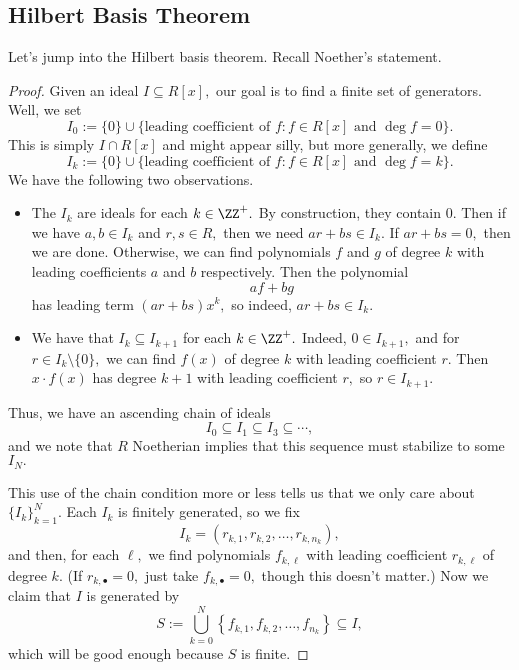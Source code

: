 \documentclass[../notes.tex]{subfiles}
\begin{document}
\subsection{Hilbert Basis Theorem}
Let's jump into the Hilbert basis theorem. Recall Noether's statement.
\hilbert*
\begin{proof}
	Given an ideal $I\subseteq R[x],$ our goal is to find a finite set of generators. Well, we set
	\[I_0:=\{0\}\cup\{\text{leading coefficient of }f:f\in R[x]\text{ and }\deg f=0\}.\]
	This is simply $I\cap R[x]$ and might appear silly, but more generally, we define
	\[I_k:=\{0\}\cup\{\text{leading coefficient of }f:f\in R[x]\text{ and }\deg f=k\}.\]
	We have the following two observations.
	\begin{itemize}
		\item The $I_k$ are ideals for each $k\in\ZZ^+.$ By construction, they contain $0.$ Then if we have $a,b\in I_k$ and $r,s\in R,$ then we need $ar+bs\in I_k.$ If $ar+bs=0,$ then we are done. Otherwise, we can find polynomials $f$ and $g$ of degree $k$ with leading coefficients $a$ and $b$ respectively. Then the polynomial
		\[af+bg\]
		has leading term $\left(ar+bs\right)x^k,$ so indeed, $ar+bs\in I_k.$
		\item We have that $I_k\subseteq I_{k+1}$ for each $k\in\ZZ^+.$ Indeed, $0\in I_{k+1},$ and for $r\in I_k\setminus\{0\},$ we can find $f(x)$ of degree $k$ with leading coefficient $r.$ Then $x\cdot f(x)$ has degree $k+1$ with leading coefficient $r,$ so $r\in I_{k+1}.$
	\end{itemize}
	Thus, we have an ascending chain of ideals
	\[I_0\subseteq I_1\subseteq I_3\subseteq\cdots,\]
	and we note that $R$ Noetherian implies that this sequence must stabilize to some $I_N.$

	This use of the chain condition more or less tells us that we only care about $\{I_k\}_{k=1}^N.$ Each $I_k$ is finitely generated, so we fix
	\[I_k=(r_{k,1},r_{k,2},\ldots,r_{k,n_k}),\]
	and then, for each $\ell,$ we find polynomials $f_{k,\ell}$ with leading coefficient $r_{k,\ell}$ of degree $k.$ (If $r_{k,\bullet}=0,$ just take $f_{k,\bullet}=0,$ though this doesn't matter.) Now we claim that $I$ is generated by
	\[S:=\bigcup_{k=0}^N\left\{f_{k,1},f_{k,2},\ldots,f_{n_k}\right\}\subseteq I,\]
	which will be good enough because $S$ is finite.


\end{proof}
\end{document}
